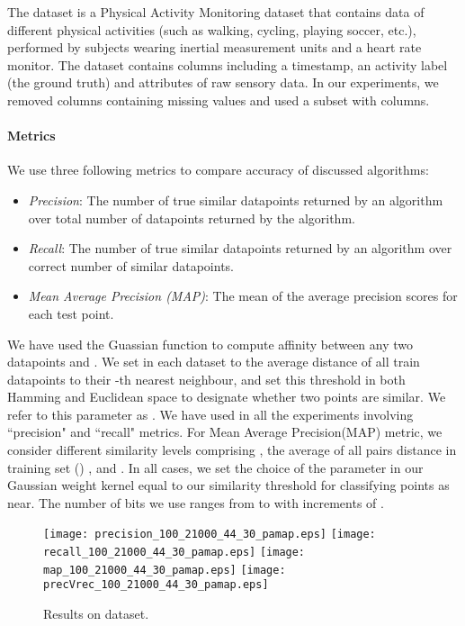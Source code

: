\documentclass{sig-alternate}
\newlength{\figsize} \setlength{\figsize}{0.22\textwidth}
\begin{document}
The \cite{reiss2012introducing} dataset is a Physical Activity Monitoring dataset that contains data of  different physical activities (such as walking, cycling, playing soccer, etc.), performed by  subjects wearing  inertial measurement units and a heart rate monitor. The dataset contains  columns including a timestamp, an activity label (the ground truth) and  attributes of raw sensory data. In our experiments, we removed columns containing missing values and used a subset with  columns.

\paragraph{Metrics}
We use three following metrics to compare accuracy of discussed algorithms:
\begin{itemize}
\item \textit{Precision}: The number of true similar datapoints returned by an algorithm over total number of datapoints returned by the algorithm.
\item \textit{Recall}: The number of true similar datapoints returned by an algorithm over correct number of similar datapoints.
\item \textit{Mean Average Precision (MAP)}: The mean of the average precision scores for each test point.
\end{itemize}

We have used the Guassian function  to compute affinity between any two datapoints  and . We set  in each dataset to the average distance of all train datapoints to their -th nearest neighbour, and set this threshold in both Hamming and Euclidean space to designate whether two points are similar. We refer to this parameter as . We have used  in all the experiments involving ``precision" and ``recall" metrics. 
For Mean Average Precision(MAP) metric, we consider  different similarity levels comprising , the average of all pairs distance in training set () , and . In all cases, we set the choice of the  parameter in our Gaussian weight kernel equal to our similarity threshold for classifying points as near. The number of bits we use ranges from  to  with increments of .



\begin{figure}[t!]
\begin{centering}
\texttt{[image: precision\_100\_21000\_44\_30\_pamap.eps]}
\texttt{[image: recall\_100\_21000\_44\_30\_pamap.eps]}
\texttt{[image: map\_100\_21000\_44\_30\_pamap.eps]}
\texttt{[image: precVrec\_100\_21000\_44\_30\_pamap.eps]}
\vspace{-3mm}
\caption{\label{fig:pamap}
Results on  dataset.}  
\vspace{-2mm}
\end{centering}
\end{figure}
\end{document}
